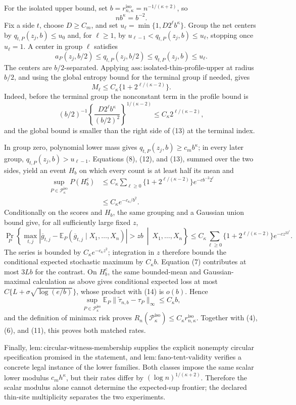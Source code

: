 For the isolated upper bound, set \(b=r_{n,\kappa}^{\mathrm{iso}}=n^{-1/(\kappa+2)}\), so
\[
 nb^\kappa=b^{-2}. \tag{12}
\]
Fix a side \(t\), choose \(D\ge C_m\), and set \(u_\ell=\min\{1,D2^\ell b^\kappa\}\).  Group the net centers by \(q_{t,P}(z_j,b)\le u_0\) and, for \(\ell\ge1\), by \(u_{\ell-1}<q_{t,P}(z_j,b)\le u_\ell\), stopping once \(u_\ell=1\).  A center in group \(\ell\) satisfies
\[
 a_P(z_j,b/2)\le q_{t,P}(z_j,b/2)\le q_{t,P}(z_j,b)\le u_\ell.
\]
The centers are \(b/2\)-separated.  Applying \(\mathrm{ass:isolated\text{-}thin\text{-}profile\text{-}upper}\) at radius \(b/2\), and using the global entropy bound for the terminal group if needed, gives
\[
 M_\ell\le C_\kappa\{1+2^{\ell/(\kappa-2)}\}. \tag{13}
\]
Indeed, before the terminal group the nonconstant term in the profile bound is
\[
 (b/2)^{-1}\left\{\frac{D2^\ell b^\kappa}{(b/2)^2}\right\}^{1/(\kappa-2)}
 \le C_\kappa2^{\ell/(\kappa-2)},
\]
and the global bound is smaller than the right side of (13) at the terminal index.

In group zero, polynomial lower mass gives \(q_{t,P}(z_j,b)\ge c_mb^\kappa\); in every later group, \(q_{t,P}(z_j,b)>u_{\ell-1}\).  Equations (8), (12), and (13), summed over the two sides, yield an event \(H_b\) on which every count is at least half its mean and
\[
 \begin{aligned}
 \sup_{P\in\mathcal P_\kappa^{\mathrm{iso}}}P(H_b^c)
 &\le C_\kappa\sum_{\ell\ge0}
 \{1+2^{\ell/(\kappa-2)}\}e^{-c b^{-2}2^\ell}\\
 &\le C_\kappa e^{-c_\kappa/b^2}. \tag{14}
 \end{aligned}
\]
Conditionally on the scores and \(H_b\), the same grouping and a Gaussian union bound give, for all sufficiently large fixed \(z\),
\[
 \Pr_P\left\{
 \max_{t,j}|\overline g_{t,j}-\mathbb E_P(\overline g_{t,j}\mid X_1,\ldots,X_n)|>zb
 \ \middle|\ X_1,\ldots,X_n\right\}
 \le C_\kappa\sum_{\ell\ge0}
 \{1+2^{\ell/(\kappa-2)}\}e^{-c z^22^\ell}.
\]
The series is bounded by \(C_\kappa e^{-c_\kappa z^2}\); integration in \(z\) therefore bounds the conditional expected stochastic maximum by \(C_\kappa b\).  Equation (7) contributes at most \(3Lb\) for the contrast.  On \(H_b^c\), the same bounded-mean and Gaussian-maximal calculation as above gives conditional expected loss at most \(C\{L+\sigma\sqrt{\log(e/b)}\}\), whose product with (14) is \(o(b)\).  Hence
\[
 \sup_{P\in\mathcal P_\kappa^{\mathrm{iso}}}
 \mathbb E_P\|\widetilde\tau_{n,b}-\tau_P\|_\infty
 \le C_\kappa b,
\]
and the definition of minimax risk proves \(R_n(\mathcal P_\kappa^{\mathrm{iso}})\le C_\kappa r_{n,\kappa}^{\mathrm{iso}}\).  Together with (4), (6), and (11), this proves both matched rates.

Finally, \(\mathrm{lem:circular\text{-}witness\text{-}membership}\) supplies the explicit nonempty circular specification promised in the statement, and \(\mathrm{lem:fano\text{-}tent\text{-}validity}\) verifies a concrete legal instance of the lower families.  Both classes impose the same scalar lower modulus \(c_mh^\kappa\), but their rates differ by \((\log n)^{1/(\kappa+2)}\).  Therefore the scalar modulus alone cannot determine the expected-sup frontier; the declared thin-site multiplicity separates the two experiments.